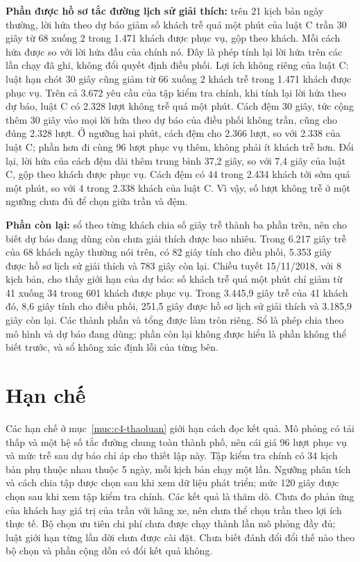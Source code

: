\textbf{Phần được hồ sơ tắc đường lịch sử giải thích:} trên 21 kịch bản ngày thường, lời hứa theo dự báo giảm số khách trễ quá một phút của luật C trần 30 giây từ 68 xuống 2 trong 1.471 khách được phục vụ, gộp theo khách. Mỗi cách hứa được so với lời hứa đầu của chính nó. Đây là phép tính lại lời hứa trên các lần chạy đã ghi, không đổi quyết định điều phối. Lợi ích không riêng của luật C: luật hạn chót 30 giây cũng giảm từ 66 xuống 2 khách trễ trong 1.471 khách được phục vụ. Trên cả 3.672 yêu cầu của tập kiểm tra chính, khi tính lại lời hứa theo dự báo, luật C có 2.328 lượt không trễ quá một phút. Cách đệm 30 giây, tức cộng thêm 30 giây vào mọi lời hứa theo dự báo của điều phối không trần, cũng cho đúng 2.328 lượt. Ở ngưỡng hai phút, cách đệm cho 2.366 lượt, so với 2.338 của luật C; phần hơn đi cùng 96 lượt phục vụ thêm, không phải ít khách trễ hơn. Đổi lại, lời hứa của cách đệm dài thêm trung bình 37,2 giây, so với 7,4 giây của luật C, gộp theo khách được phục vụ. Cách đệm có 44 trong 2.434 khách tới sớm quá một phút, so với 4 trong 2.338 khách của luật C. Vì vậy, số lượt không trễ ở một ngưỡng chưa đủ để chọn giữa trần và đệm.

\textbf{Phần còn lại:} sổ theo từng khách chia số giây trễ thành ba phần trên, nên cho biết dự báo đang dùng còn chưa giải thích được bao nhiêu. Trong 6.217 giây trễ của 68 khách ngày thường nói trên, có 82 giây tính cho điều phối, 5.353 giây được hồ sơ lịch sử giải thích và 783 giây còn lại. Chiều tuyết 15/11/2018, với 8 kịch bản, cho thấy giới hạn của dự báo: số khách trễ quá một phút chỉ giảm từ 41 xuống 34 trong 601 khách được phục vụ. Trong 3.445,9 giây trễ của 41 khách đó, 8,6 giây tính cho điều phối, 251,5 giây được hồ sơ lịch sử giải thích và 3.185,9 giây còn lại. Các thành phần và tổng được làm tròn riêng. Sổ là phép chia theo mô hình và dự báo đang dùng; phần còn lại không được hiểu là phần không thể biết trước, và sổ không xác định lỗi của từng bên.

\section{Hạn chế}
\label{muc:c5-hanche}

Các hạn chế ở mục~\ref{muc:c4-thaoluan} giới hạn cách đọc kết quả. Mô phỏng có tải thấp và một hệ số tắc đường chung toàn thành phố, nên cái giá 96 lượt phục vụ và mức trễ sau dự báo chỉ áp cho thiết lập này. Tập kiểm tra chính có 34 kịch bản phụ thuộc nhau thuộc 5 ngày, mỗi kịch bản chạy một lần. Ngưỡng phân tích và cách chia tập được chọn sau khi xem dữ liệu phát triển; mức 120 giây được chọn sau khi xem tập kiểm tra chính. Các kết quả là thăm dò. Chưa đo phản ứng của khách hay giá trị của trần với hãng xe, nên chưa thể chọn trần theo lợi ích thực tế. Bộ chọn ưu tiên chi phí chưa được chạy thành lần mô phỏng đầy đủ; luật giới hạn từng lần dời chưa được cài đặt. Chưa biết đánh đổi đổi thế nào theo bộ chọn và phần cộng dồn có đổi kết quả không.

